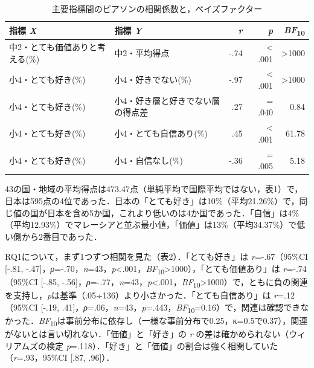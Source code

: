 \documentclass[a4paper,10pt,twocolumn]{ltjsarticle}
\makeatletter
\renewcommand{\section}{\@startsection{section}{1}{\z@}{1.1\Cvs \@plus.4\Cdp \@minus.2\Cdp}{.5\Cvs \@plus.2\Cdp}{\normalfont\gtfamily\bfseries\large}}
\makeatother
\begin{document}
\begin{table}[!t]
\caption{主要指標間のピアソンの相関係数と，ベイズファクター}
\centering\small
\begin{tabular}{>{\raggedright\arraybackslash}p{6.4cm}>{\raggedright\arraybackslash}p{6.4cm}rrr}
\toprule
指標 \textit{X} & 指標 \textit{Y} & \textit{r} & \textit{p} & \textit{BF}\textsubscript{10} \\
\midrule
中2・とても価値ありと考える(\%) & 中2・平均得点 & -.74 & < .001 & >1000 \\
小4・とても好き(\%) & 小4・好きでない(\%) & -.97 & < .001 & >1000 \\
小4・とても好き(\%) & 小4・好き層と好きでない層の得点差 & .27 & = .040 & 0.84 \\
小4・とても好き(\%) & 小4・とても自信あり(\%) & .45 & < .001 & 61.78 \\
小4・とても好き(\%) & 小4・自信なし(\%) & -.36 & = .005 & 5.18 \\
\bottomrule
\end{tabular}
\par{}
\end{table}
\section{結果}
43の国・地域の平均得点は473.47点（単純平均で国際平均ではない，表1）で，日本は595点の4位であった．日本の「とても好き」は10\%（平均21.26\%）で，同じ値の国が日本を含め5か国，これより低いのは4か国であった．「自信」は4\%（平均12.93\%）でマレーシアと並ぶ最小値，「価値」は13\%（平均34.37\%）で低い側から2番目であった．

RQ1について，まず1つずつ相関を見た（表2）．「とても好き」は \textit{r}=-.67（95\%CI [-.81, -.47]，\textit{ρ}=-.70，\textit{n}=43，\textit{p}<.001，\textit{BF}\textsubscript{10}>1000），「とても価値あり」は \textit{r}=-.74（95\%CI [-.85, -.56]，\textit{ρ}=-.77，\textit{n}=43，\textit{p}<.001，\textit{BF}\textsubscript{10}>1000）で，ともに負の関連を支持し，\textit{p}は基準（.05÷136）より小さかった．「とても自信あり」は \textit{r}=.12（95\%CI [-.19, .41]，\textit{ρ}=.06，\textit{n}=43，\textit{p}=.443，\textit{BF}\textsubscript{10}=0.16）で，関連は確認できなかった．\textit{BF}\textsubscript{10}は事前分布に依存し（一様な事前分布で0.25，κ=0.5で0.37），関連がないとは言い切れない．「価値」と「好き」の \textit{r} の差は確かめられない（ウィリアムズの検定 \textit{p}=.118）．「好き」と「価値」の割合は強く相関していた（\textit{r}=.93，95\%CI [.87, .96]）．
\end{document}
